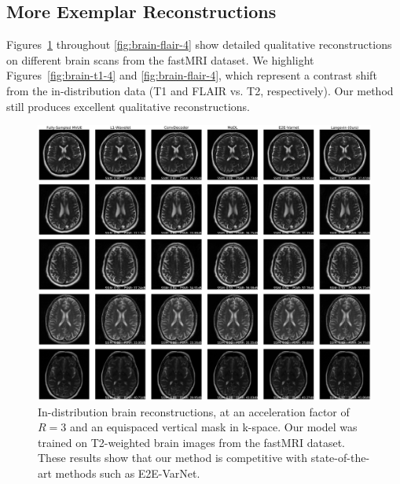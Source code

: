 \subsection{More Exemplar Reconstructions}
Figures~\ref{fig:brain-in-3} throughout \ref{fig:brain-flair-4} show detailed qualitative reconstructions on different brain scans from the fastMRI dataset. We highlight Figures~\ref{fig:brain-t1-4} and \ref{fig:brain-flair-4}, which represent a contrast shift from the in-distribution data (T1 and FLAIR vs. T2, respectively). Our method still produces excellent qualitative reconstructions.

\begin{figure}
    \centering
    \includegraphics[width=\columnwidth]{brain-equispaced-vertical-R=3-comp.pdf}
    \caption{ In-distribution brain reconstructions, at an acceleration factor of $R=3$ and an equispaced vertical mask in k-space. Our model was trained on T2-weighted brain images from the fastMRI dataset. These results show that our method is competitive with state-of-the-art methods such as E2E-VarNet.}
    \label{fig:brain-in-3}
\end{figure}

